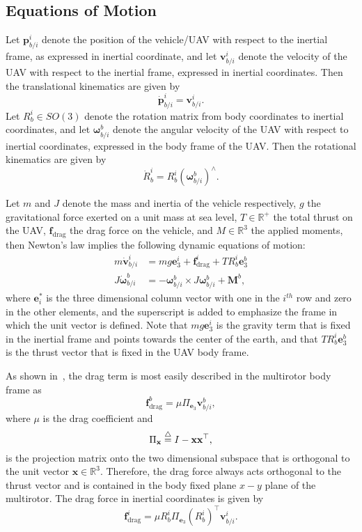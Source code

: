 \subsection{Equations of Motion}


Let $\mathbf{p}_{b/i}^i$ denote the position of the vehicle/UAV with respect to the inertial frame, as expressed in inertial coordinate, and let $\mathbf{v}_{b/i}^i$ denote the velocity of the UAV with respect to the inertial frame, expressed in inertial coordinates.  Then the translational kinematics are given by
\[
\dot{\mathbf{p}}_{b/i}^i = \mathbf{v}_{b/i}^i.
\]
Let $R_b^i\in SO(3)$ denote the rotation matrix from body coordinates to inertial coordinates, and let $\boldsymbol{\omega}_{b/i}^b$ denote the angular velocity of the UAV with respect to inertial coordinates, expressed in the body frame of the UAV.  Then the rotational kinematics are given by
\[
\dot{R}_b^i = R_b^i \left(\boldsymbol{\omega}_{b/i}^b\right)^\wedge.
\]


Let $m$ and $J$ denote the mass and inertia of the vehicle respectively, $g$ the gravitational force exerted on a unit mass at sea level, $T\in\mathbb{R}^+$ the total thrust on the UAV, $\mathbf{f}_{\text{drag}}$ the drag force on the vehicle, and $M\in\mathbb{R}^3$ the applied moments, then Newton's law implies the following dynamic equations of motion:
\begin{align*}
m\dot{\mathbf{v}}_{b/i}^i &= mg\mathbf{e}_3^i + \mathbf{f}_{\text{drag}}^i + TR_b^i\mathbf{e}_3^b \\
J\dot{\boldsymbol{\omega}}_{b/i}^b &= -\boldsymbol{\omega}_{b/i}^b \times J\boldsymbol{\omega}_{b/i}^b + \mathbf{M}^b,	
\end{align*}
where $\mathbf{e}_i^\ast$ is the three dimensional column vector with one in the $i^{th}$ row and zero in the other elements, and the superscript is added to emphasize the frame in which the unit vector is defined.  Note that $mg\mathbf{e}_3^i$ is the gravity term that is fixed in the inertial frame and points towards the center of the earth, and that $TR_b^i\mathbf{e}_3^b$ is the thrust vector that is fixed in the UAV body frame.

As shown in~\cite{LeishmanMacDonaldBeard14}, the drag term is most easily described in the multirotor body frame as 
\[
\mathbf{f}_{\text{drag}}^b = \mu \Pi_{\mathbf{e}_3}\mathbf{v}_{b/i}^b,
\]
where $\mu$ is the drag coefficient and 
\[
\Pi_\mathbf{x} \stackrel{\triangle}{=} I-\mathbf{x}\mathbf{x}^\top,
\]
is the projection matrix onto the two dimensional subspace that is orthogonal to the unit vector $\mathbf{x}\in\mathbb{R}^3$.  Therefore, the drag force always acts orthogonal to the thrust vector and is contained in the body fixed plane $x-y$ plane of the multirotor.  The drag force in inertial coordinates is given by
\[
\mathbf{f}_{\text{drag}}^i = \mu R_b^i\Pi_{\mathbf{e}_3}(R_b^i)^\top \mathbf{v}_{b/i}^i.  
\]

